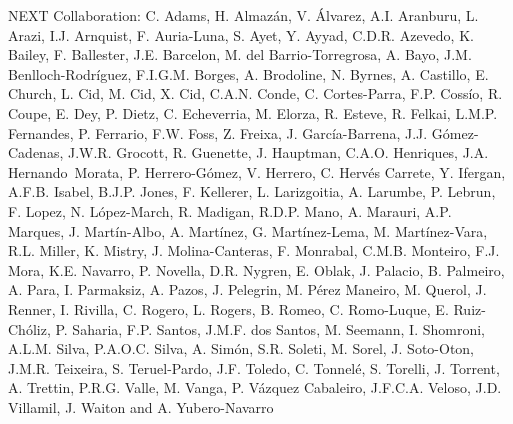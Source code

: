NEXT Collaboration: C. Adams, H. Almaz\'an, V. \'Alvarez, A.I. Aranburu, L. Arazi, I.J. Arnquist, F. Auria-Luna, S. Ayet, Y. Ayyad, C.D.R. Azevedo, K. Bailey, F. Ballester, J.E. Barcelon, M. del Barrio-Torregrosa, A. Bayo, J.M. Benlloch-Rodr\'{i}guez, F.I.G.M. Borges, A. Brodoline, N. Byrnes, A. Castillo, E. Church, L. Cid, M. Cid, X. Cid, C.A.N. Conde, C. Cortes-Parra, F.P. Coss\'io, R. Coupe, E. Dey, P. Dietz, C. Echeverria, M. Elorza, R. Esteve, R. Felkai, L.M.P. Fernandes, P. Ferrario, F.W. Foss, Z. Freixa, J. Garc\'ia-Barrena, J.J. G\'omez-Cadenas, J.W.R. Grocott, R. Guenette, J. Hauptman, C.A.O. Henriques, J.A. Hernando~Morata, P. Herrero-G\'omez, V. Herrero, C. Herv\'es Carrete, Y. Ifergan, A.F.B. Isabel, B.J.P. Jones, F. Kellerer, L. Larizgoitia, A. Larumbe, P. Lebrun, F. Lopez, N. L\'opez-March, R. Madigan, R.D.P. Mano, A. Marauri, A.P. Marques, J. Mart\'in-Albo, A. Mart\'inez, G. Mart\'inez-Lema, M. Mart\'inez-Vara, R.L. Miller, K. Mistry, J. Molina-Canteras, F. Monrabal, C.M.B. Monteiro, F.J. Mora, K.E. Navarro, P. Novella, D.R. Nygren, E. Oblak, J. Palacio, B. Palmeiro, A. Para, I. Parmaksiz, A. Pazos, J. Pelegrin, M. P\'erez Maneiro, M. Querol, J. Renner, I. Rivilla, C. Rogero, L. Rogers, B. Romeo, C. Romo-Luque, E. Ruiz-Ch\'oliz, P. Saharia, F.P. Santos, J.M.F. dos Santos, M. Seemann, I. Shomroni, A.L.M. Silva, P.A.O.C. Silva, A. Sim\'on, S.R. Soleti, M. Sorel, J. Soto-Oton, J.M.R. Teixeira, S. Teruel-Pardo, J.F. Toledo, C. Tonnel\'e, S. Torelli, J. Torrent, A. Trettin, P.R.G. Valle, M. Vanga, P. V\'azquez Cabaleiro, J.F.C.A. Veloso, J.D. Villamil, J. Waiton and A. Yubero-Navarro